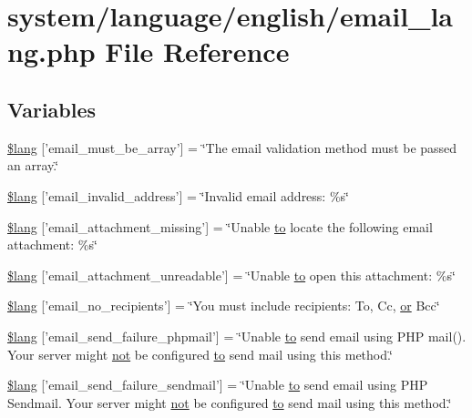 \hypertarget{email__lang_8php}{\section{system/language/english/email\-\_\-lang.php File Reference}
\label{email__lang_8php}
}
\subsection*{Variables}
\begin{DoxyCompactItemize}
\item 
\hyperlink{email__lang_8php_ac8c4b077e854bbdbb9a37b2d7f7c47fc}{\$lang} \mbox{[}'email\-\_\-must\-\_\-be\-\_\-array'\mbox{]} = \char`\"{}The email validation method must be passed an array.\char`\"{}
\item 
\hyperlink{email__lang_8php_a37759f6c728f3aaf8df6ca5bb8a3e832}{\$lang} \mbox{[}'email\-\_\-invalid\-\_\-address'\mbox{]} = \char`\"{}Invalid email address\-: \%s\char`\"{}
\item 
\hyperlink{email__lang_8php_a09c0c415b48ef267bf9e36b555be67d9}{\$lang} \mbox{[}'email\-\_\-attachment\-\_\-missing'\mbox{]} = \char`\"{}Unable \hyperlink{mathquill_8js_ae3622f38202b3532cd6eae25726945f8}{to} locate the following email attachment\-: \%s\char`\"{}
\item 
\hyperlink{email__lang_8php_acae2e9f7ade1ac9c6b67db0ff752414e}{\$lang} \mbox{[}'email\-\_\-attachment\-\_\-unreadable'\mbox{]} = \char`\"{}Unable \hyperlink{mathquill_8js_ae3622f38202b3532cd6eae25726945f8}{to} open this attachment\-: \%s\char`\"{}
\item 
\hyperlink{email__lang_8php_a8f9d5a049f4dd899d4e61f6d56be5071}{\$lang} \mbox{[}'email\-\_\-no\-\_\-recipients'\mbox{]} = \char`\"{}You must include recipients\-: To, Cc, \hyperlink{mathquill_8js_a6fdf1c439b25d95597e99492b728acaa}{or} Bcc\char`\"{}
\item 
\hyperlink{email__lang_8php_a99a2ce89426340b4c96a245b7874a99d}{\$lang} \mbox{[}'email\-\_\-send\-\_\-failure\-\_\-phpmail'\mbox{]} = \char`\"{}Unable \hyperlink{mathquill_8js_ae3622f38202b3532cd6eae25726945f8}{to} send email using P\-H\-P mail(). Your server might \hyperlink{mathquill_8js_ac1e1ab538c27d68cc2cbafea74e7412c}{not} be configured \hyperlink{mathquill_8js_ae3622f38202b3532cd6eae25726945f8}{to} send mail using this method.\char`\"{}
\item 
\hyperlink{email__lang_8php_a0cfda188d86472ad2f3b96a67de75b4d}{\$lang} \mbox{[}'email\-\_\-send\-\_\-failure\-\_\-sendmail'\mbox{]} = \char`\"{}Unable \hyperlink{mathquill_8js_ae3622f38202b3532cd6eae25726945f8}{to} send email using P\-H\-P Sendmail. Your server might \hyperlink{mathquill_8js_ac1e1ab538c27d68cc2cbafea74e7412c}{not} be configured \hyperlink{mathquill_8js_ae3622f38202b3532cd6eae25726945f8}{to} send mail using this method.\char`\"{}

\end{DoxyCompactItemize}
